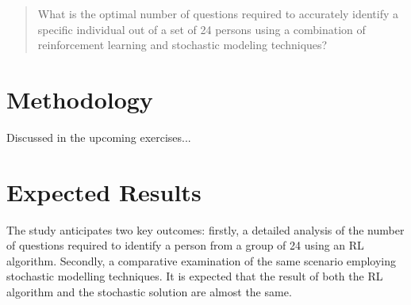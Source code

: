 \begin{quote}
	What is the optimal number of questions required to accurately identify a specific individual out of a set of 24 persons using a combination of reinforcement learning and stochastic modeling techniques?
\end{quote}


\section{Methodology}

\iffalse
To answer this question, the bachelor thesis (master thesis) will be realized
as a combination of literature work and practical or prototypical
implementation.

First, the existing literature (extending section \ref{sec:state-of-the-art})
will show how the topic of smooth transition gameplay is dealt with from a
game design perspective. Common factors such as mechanics will be extracted
from this and serve as the basis for a theoretical framework. This framework
will contain a list of core mechanics and guidelines for their application so
that LPD games allow easy entry and a variable number of players.

The applicability of this framework will be tested by an own LPD game developed
during the term project. By asking simple qualitative questions to the players
and observing the visitors during several test runs, it will be determined
whether smooth transition gameplay could be achieved with the mechanics used.
\fi
Discussed in the upcoming exercises...

\section{Expected Results}

The study anticipates two key outcomes: firstly, a detailed analysis of the number of questions required to identify a person from a group of 24 using an RL algorithm. Secondly, a comparative examination of the same scenario employing stochastic modelling techniques. It is expected that the result of both the RL algorithm and the stochastic solution are almost the same.